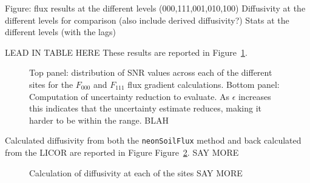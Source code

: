 \documentclass[
  letterpaper,
  DIV=11,
  numbers=noendperiod]{scrartcl}
\begin{document}
Figure: flux results at the different levels (000,111,001,010,100)
Diffusivity at the different levels for comparison (also include derived
diffusivity?) Stats at the different levels (with the lags)

LEAD IN TABLE HERE These results are reported in
Figure~\ref{fig-uncertainty-stats}.

\begin{figure}


\caption{\label{fig-uncertainty-stats}Top panel: distribution of SNR
values across each of the different sites for the \(F_{000}\) and
\(F_{111}\) flux gradient calculations. Bottom panel: Computation of
uncertainty reduction to evaluate. As \(\epsilon\) increases this
indicates that the uncertainty estimate reduces, making it harder to be
within the range. BLAH}

\end{figure}%

Calculated diffusivity from both the \texttt{neonSoilFlux} method and
back calculated from the LICOR are reported in Figure
Figure~\ref{fig-diffusivity-plot}. SAY MORE

\begin{figure}


\caption{\label{fig-diffusivity-plot}Calculation of diffusivity at each
of the sites SAY MORE}

\end{figure}%
\end{document}

